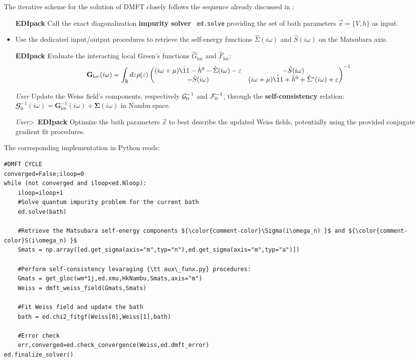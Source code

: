 \documentclass[edipack_sp.tex]{subfiles}
\begin{document}
The iterative scheme for the solution of DMFT closely follows the
sequence already discussed in :   
\begin{itemize}
\item[{\tiny {\bf EDIpack}}] Call the exact diagonalization {\bf impurity solver} {\tt
    ed.solve} providing the set of bath parameters $\vec{x}=\{V,h\}$  as input. 

\item Use the dedicated
  input/output \NAME procedures to retrieve the self-energy functions  
  $\hat{\Sigma}(i\omega)$ and $\hat{S}(i\omega)$ on the 
  Matsubara axis.
  
\item[{\tiny {\bf EDIpack}}]
  Evaluate the interacting local Green's functions $\hat{G}_\mathrm{loc}$ and
  $\hat{F}_\mathrm{loc}$:
  \begin{equation}
  {\mathbf G}_\mathrm{loc}(i\omega) =
  \int_\RRR d\e \rho(\e)
  \begin{pmatrix}
    (i\omega +\mu)\hat{\11} - \hat{h}^0 - \hat{\Sigma}(i\omega) -\e & -\hat{S}(i\omega) \\
    -\hat{S}(i\omega) & (i\omega +\mu)\hat{\11} + \hat{h}^0 +
    \hat{\Sigma}^*(i\omega) +\e\\
  \end{pmatrix}^{-1}
\end{equation}

\item[{\tiny {\it User}}] Update the Weiss field's components, respectively 
  ${\cal G}_0^{-1}$ and ${\cal F}_0^{-1}$, through the {\bf self-con\-sis\-ten\-cy}
  relation: $\mathbfcal{G}^{-1}_0(i\omega) = {\mathbf G}^{-1}_\mathrm{loc}(i\omega) +
  {\mathbf \Sigma}(i\omega)$ in Nambu space.
  
\item[{\tiny {\it User}}\textgreater\ {\tiny {\bf EDIpack}}] Optimize the bath parameters $\vec{x}$ to best describe the updated
    Weiss fields, potentially using the \NAME provided conjugate gradient  fit
    procedures.
  \end{itemize}
%
The corresponding implementation in Python reads:
\begin{lstlisting}[style=mypython,numbers=none,basicstyle={\scriptsize\ttfamily}]
#DMFT CYCLE
converged=False;iloop=0
while (not converged and iloop<ed.Nloop):
    iloop=iloop+1
    #Solve quantum impurity problem for the current bath
    ed.solve(bath)    

    #Retrieve the Matsubara self-energy components ${\color{comment-color}\Sigma(i\omega_n) }$ and ${\color{comment-color}S(i\omega_n) }$
    Smats = np.array([ed.get_sigma(axis="m",typ="n"),ed.get_sigma(axis="m",typ="a")])   
    
    #Perform self-consistency levaraging {\tt aux\_funx.py} procedures:
    Gmats = get_gloc(wm*1j,ed.xmu,HkNambu,Smats,axis="m")
    Weiss = dmft_weiss_field(Gmats,Smats)    
    
    #Fit Weiss field and update the bath
    bath = ed.chi2_fitgf(Weiss[0],Weiss[1],bath)

    #Error check
    err,converged=ed.check_convergence(Weiss,ed.dmft_error)
ed.finalize_solver()
\end{lstlisting}
\end{document}
